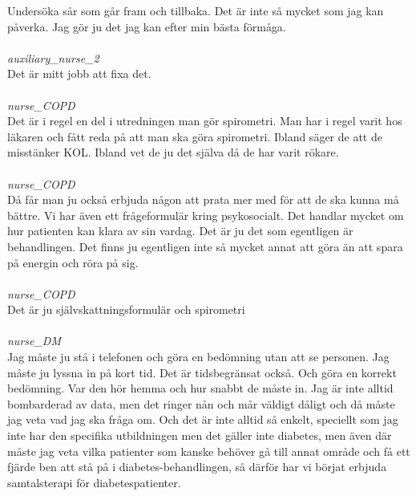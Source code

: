 \documentclass[12pt,a4paper,oneside]{article}
\begin{document}
Unders{\"o}ka s{\aa}r som g{\aa}r fram och tillbaka. Det {\"a}r inte s{\aa} mycket som jag kan p{\aa}verka. Jag g{\"o}r ju det jag kan efter min b{\"a}sta f{\"o}rm{\aa}ga. %
\ \\\ \\
 { \it   auxiliary\_nurse\_2 %
}\\
Det {\"a}r mitt jobb att fixa det. %
\ \\\ \\
 { \it   nurse\_COPD %
}\\
Det {\"a}r i regel en del i utredningen man g{\"o}r spirometri. Man har i regel varit hos l{\"a}karen och f{\aa}tt reda p{\aa} att man ska g{\"o}ra spirometri. Ibland s{\"a}ger de att de misst{\"a}nker KOL. Ibland vet de ju det sj{\"a}lva d{\aa} de har varit r{\"o}kare. %
\ \\\ \\
 { \it   nurse\_COPD %
}\\
D{\aa} f{\aa}r man ju ocks{\aa} erbjuda n{\aa}gon att prata mer med f{\"o}r att de ska kunna m{\aa} b{\"a}ttre. Vi har {\"a}ven ett fr{\aa}geformul{\"a}r kring psykosocialt. Det handlar mycket om hur patienten kan klara av sin vardag. Det {\"a}r ju det som egentligen {\"a}r behandlingen. Det finns ju egentligen inte s{\aa} mycket annat att g{\"o}ra {\"a}n att spara p{\aa} energin och r{\"o}ra p{\aa} sig. %
\ \\\ \\
 { \it   nurse\_COPD %
}\\
Det {\"a}r ju sj{\"a}lvskattningsformul{\"a}r och spirometri %
\ \\\ \\
 { \it   nurse\_DM %
}\\
Jag m{\aa}ste ju st{\aa} i telefonen och g{\"o}ra en bed{\"o}mning utan att se personen. Jag m{\aa}ste ju lyssna in p{\aa} kort tid. Det {\"a}r tidsbegr{\"a}nsat ocks{\aa}. Och g{\"o}ra en korrekt bed{\"o}mning. Var den h{\"o}r hemma och hur snabbt de m{\aa}ste in. Jag {\"a}r inte alltid bombarderad av data, men det ringer n{\aa}n och m{\aa}r v{\"a}ldigt d{\aa}ligt och d{\aa} m{\aa}ste jag veta vad jag ska fr{\aa}ga om. Och det {\"a}r inte alltid s{\aa} enkelt, speciellt som jag inte har den specifika utbildningen men det g{\"a}ller inte diabetes, men {\"a}ven d{\"a}r m{\aa}ste jag veta vilka patienter som kanske beh{\"o}ver g{\aa} till annat omr{\aa}de och f{\aa} ett fj{\"a}rde ben att st{\aa} p{\aa} i diabetes-behandlingen, s{\aa} d{\"a}rf{\"o}r har vi b{\"o}rjat erbjuda samtalsterapi f{\"o}r diabetespatienter. %
\end{document}
